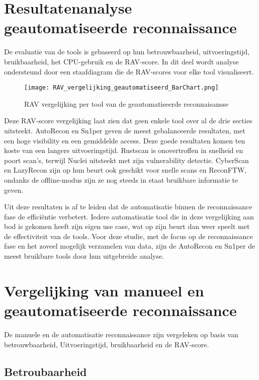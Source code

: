 \section{Resultatenanalyse geautomatiseerde reconnaissance}

De evaluatie van de tools is gebaseerd op hun betrouwbaarheid, uitvoeringstijd, bruikbaarheid, het CPU-gebruik en de RAV-score. 
In dit deel wordt analyse ondersteund door een staafdiagram die de RAV-scores voor elke tool visualiseert.  

\begin{figure}[H] 
\centering
\texttt{[image: RAV\_vergelijking\_geautomatiseerd\_BarChart.png]}
\caption{RAV vergelijking per tool van de geautomatiseerde reconnaisansse}
\label{fig:rav_barplot_automatisatie}
\end{figure}

Deze RAV-score vergelijking laat zien dat geen enkele tool over al de drie secties uitsteekt. 
AutoRecon en Sn1per geven de meest gebalanceerde resultaten, met een hoge visibility en een gemiddelde access. Deze goede resultaten komen ten koste van een langere uitvoeringstijd.
Rustscan is onovertroffen in snelheid en poort scan's, terwijl Nuclei uitsteekt met zijn vulnerability detectie.
CyberScan en LazyRecon zijn op hun beurt ook geschikt voor snelle scans en ReconFTW, ondanks de offline-modus zijn ze nog steeds in staat bruikbare informatie te geven. 

Uit deze resultaten is af te leiden dat de automatisatie binnen de reconnaissance fase de efficiëntie verbetert. 
Iedere automatisatie tool die in deze vergelijking aan bod is gekomen heeft zijn eigen use case, wat op zijn beurt dan weer speelt met de effectiviteit van de tools.
Voor deze studie, met de focus op de reconnaissance fase en het zoveel mogelijk verzamelen van data, zijn de AutoRecon en Sn1per de meest bruikbare tools door hun uitgebreide analyse.

\section{Vergelijking van manueel en geautomatiseerde reconnaissance}
De manuele en de automatisatie reconnaissance zijn vergeleken op basis van betrouwbaarheid, Uitvoeringstijd, bruikbaarheid en de RAV-score.
\subsection{Betroubaarheid}

